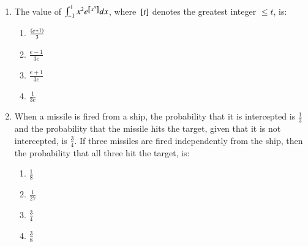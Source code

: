 \documentclass[journal,12pt,onecolumn]{IEEEtran}
\theoremstyle{remark}
\begin{document}
\begin{enumerate}[start=16]
\begin{enumerate}
		\end{enumerate}
	\item The value of $\int_{-1}^{1} x^2e^{{}\left[x^3\right]} dx$, where ${}\left[t\right]$ denotes the greatest integer $\leq t$, is:
		\begin{enumerate}
			\item $\frac{\left(e+1\right)}{3}$\\
			\item $\frac{e-1}{3e}$\\
			\item $\frac{e+1}{3e}$\\
			\item $\frac{1}{3e}$
		\end{enumerate}
	\item When a missile is fired from a ship, the probability that it is intercepted is $\frac{1}{3}$ and the probability that the missile hits the target, given that it is not intercepted, is $\frac{3}{4}$. If three missiles are fired independently from the ship, then the probability that all three hit the target, is:
		\begin{enumerate}
			\item $\frac{1}{8}$\\
			\item $\frac{1}{27}$\\
			\item $\frac{3}{4}$\\
			\item $\frac{3}{8}$
		\end{enumerate}
\end{enumerate}
\end{document}
